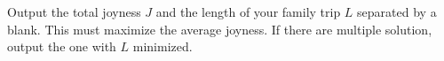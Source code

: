 Output the total joyness $J$ and the length of your family trip $L$ separated by a blank.
This must maximize the average joyness. If there are multiple solution, output the one with $L$ minimized.
